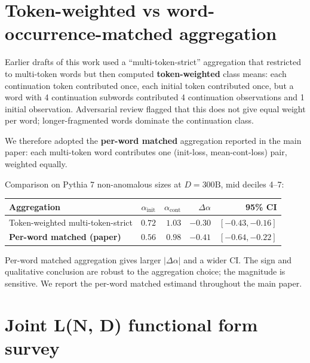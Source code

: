 \documentclass[10pt]{article}
\newcommand{\dalpha}{\Delta\alpha}
\newcommand{\ainit}{\alpha_\mathrm{init}}
\newcommand{\acont}{\alpha_\mathrm{cont}}
\begin{document}



\appendix

\section{Token-weighted vs word-occurrence-matched aggregation}
\label{app:agg}

Earlier drafts of this work used a ``multi-token-strict'' aggregation
that restricted to multi-token words but then computed
\textbf{token-weighted} class means: each continuation token
contributed once, each initial token contributed once, but a word
with 4 continuation subwords contributed 4 continuation observations
and 1 initial observation. Adversarial review flagged that this does
not give equal weight per word; longer-fragmented words dominate the
continuation class.

We therefore adopted the \textbf{per-word matched} aggregation
reported in the main paper: each multi-token word contributes one
(init-loss, mean-cont-loss) pair, weighted equally.

Comparison on Pythia 7 non-anomalous sizes at $D{=}300\text{B}$, mid
deciles 4--7:
\begin{center}
\small
\begin{tabular}{lrrrr}
\toprule
Aggregation & $\ainit$ & $\acont$ & $\dalpha$ & 95\% CI \\
\midrule
Token-weighted multi-token-strict     & $0.72$ & $1.03$ & $-0.30$ & $[-0.43, -0.16]$ \\
\textbf{Per-word matched (paper)}     & $\mathbf{0.56}$ & $\mathbf{0.98}$ & $\mathbf{-0.41}$ & $\mathbf{[-0.64, -0.22]}$ \\
\bottomrule
\end{tabular}
\end{center}

Per-word matched aggregation gives larger $|\dalpha|$ and a wider CI.
The sign and qualitative conclusion are robust to the aggregation
choice; the magnitude is sensitive. We report the per-word matched
estimand throughout the main paper.

\section{Joint L(N, D) functional form survey}
\label{app:joint}
\end{document}

